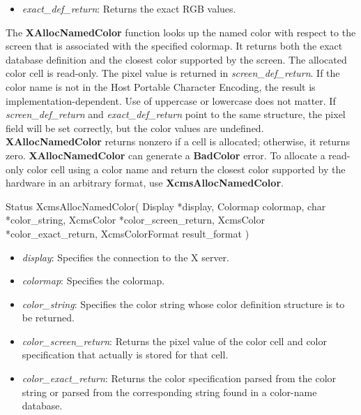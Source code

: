 \documentclass{report}
\begin{document}
\begin{itemize}
\begin{itemize}
                \item \textit{exact\_def\_return}: Returns the exact RGB values.
            \end{itemize}
            \noindent
            The \textbf{XAllocNamedColor} function looks up the named color with respect to the screen that is associated with the specified colormap. It returns both the exact database definition and the closest color supported by the screen. The allocated color cell is read-only. The pixel value is returned in \textit{screen\_def\_return}. If the color name is not in the Host Portable Character Encoding, the result is implementation-dependent. Use of uppercase or lowercase does not matter. If \textit{screen\_def\_return} and \textit{exact\_def\_return} point to the same structure, the pixel field will be set correctly, but the color values are undefined. \textbf{XAllocNamedColor} returns nonzero if a cell is allocated; otherwise, it returns zero.
            \bigbreak \noindent
            \textbf{XAllocNamedColor} can generate a \textbf{BadColor} error.
            \bigbreak \noindent
            To allocate a read-only color cell using a color name and return the closest color supported by the hardware in an arbitrary format, use \textbf{XcmsAllocNamedColor}.
            \bigbreak \noindent 
            \begin{cppcode}
                Status XcmsAllocNamedColor(
                    Display *display,
                    Colormap colormap,
                    char *color_string,
                    XcmsColor *color_screen_return,
                    XcmsColor *color_exact_return,
                    XcmsColorFormat result_format
                )
            \end{cppcode}
            \begin{itemize}
                \item \textit{display}: Specifies the connection to the X server.
                \item \textit{colormap}: Specifies the colormap.
                \item \textit{color\_string}: Specifies the color string whose color definition structure is to be returned.
                \item \textit{color\_screen\_return}: Returns the pixel value of the color cell and color specification that actually is stored for that cell.
                \item \textit{color\_exact\_return}: Returns the color specification parsed from the color string or parsed from the corresponding string found in a color-name database.

\end{itemize}
\end{itemize}
\end{document}
